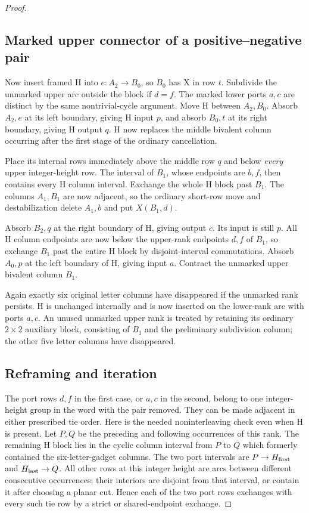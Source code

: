 \documentclass[11pt,a4paper]{article}
\theoremstyle{remark}
\begin{document}
\begin{proof}
\subsection{Marked upper connector of a positive--negative pair}

Now insert framed H into $e:A_2\to B_0$, so $B_0$ has X in row $t$.
Subdivide the unmarked upper arc outside the block if $d=f$.
The marked lower ports $a,c$ are distinct by the same nontrivial-cycle
argument.
Move H between $A_2,B_0$.  Absorb $A_2,e$ at its left boundary, giving
H input $p$, and absorb $B_0,t$ at its right boundary, giving H output
$q$.  H now replaces the middle bivalent column occurring after the
first stage of the ordinary cancellation.

Place its internal rows immediately above the middle row $q$ and below
\emph{every} upper integer-height row.  The interval of $B_1$, whose
endpoints are $b,f$, then contains every H column interval.  Exchange
the whole H block past $B_1$.  The columns $A_1,B_1$ are now adjacent,
so the ordinary short-row move and destabilization delete $A_1,b$ and
put $X(B_1,d)$.

Absorb $B_2,q$ at the right boundary of H, giving output $c$.
Its input is still $p$.  All H column endpoints are now below the
upper-rank endpoints $d,f$ of $B_1$, so exchange $B_1$ past the entire
H block by disjoint-interval commutations.  Absorb $A_0,p$ at the left
boundary of H, giving input $a$.  Contract the unmarked upper bivalent
column $B_1$.

Again exactly six original letter columns have disappeared if the
unmarked rank persists.  H is
unchanged internally and is now inserted on the lower-rank arc with
ports $a,c$.  An unused unmarked upper rank is treated by retaining its
ordinary $2\times2$ auxiliary block, consisting of $B_1$ and the
preliminary subdivision column; the other five letter columns have
disappeared.

\subsection{Reframing and iteration}

The port rows $d,f$ in the first case, or $a,c$ in the second, belong to
one integer-height group in the word with the pair removed.  They can
be made adjacent in either prescribed tie order.  Here is the needed
noninterleaving check even when H is present.  Let $P,Q$ be the
preceding and following occurrences of this rank.  The remaining H
block lies in the cyclic column interval from $P$ to $Q$ which formerly
contained the six-letter-gadget columns.  The two port intervals are
$P\to H_{\rm first}$ and $H_{\rm last}\to Q$.  All other rows at this
integer height are arcs between different consecutive occurrences;
their interiors are disjoint from that interval, or contain it after
choosing a planar cut.  Hence each of the two port rows exchanges with
every such tie row by a strict or shared-endpoint exchange.


\end{proof}
\end{document}
